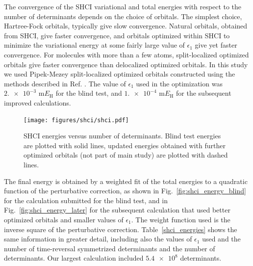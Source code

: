 \documentclass[journal=jcp,manuscript=suppinfo]{achemso}
\begin{document}
The convergence of the SHCI variational and total energies with respect to the number of determinants depends on the choice of orbitals. The simplest choice, Hartree-Fock orbitals, typically give slow convergence. Natural orbitals, obtained from SHCI, give faster convergence, and orbitals optimized within SHCI to minimize the variational energy at some fairly large value of $\epsilon_1$ give yet faster convergence. For molecules with more than a few atoms, split-localized optimized orbitals give faster convergence than delocalized optimized orbitals. In this study we used Pipek-Mezey split-localized optimized orbitals constructed using the methods described in Ref. . The value of $\epsilon_1$ used in the optimization was $\num{2.e-3}$ m$E_{\text{H}}$ for the blind test, and $\num{1.e-4}$ m$E_{\text{H}}$ for the subsequent improved calculations.\\

%
\begin{figure}[ht!]
\begin{center}
\texttt{[image: figures/shci/shci.pdf]}
\caption{SHCI energies versus number of determinants.  Blind test energies are plotted with solid lines, updated energies obtained with further optimized orbitals (not part of main study) are plotted with dashed lines.}
\label{shci_SI_fig}
\end{center}
\vspace{-0.6cm}
\end{figure}
%
The final energy is obtained by a weighted fit of the total energies to a quadratic function of the perturbative correction, as shown in Fig.~\ref{fig:shci_energy_blind} for the calculation submitted for the blind test, and in Fig.~\ref{fig:shci_energy_later} for the subsequent calculation that used better optimized orbitals and smaller values of $\epsilon_1$. The weight function used is the inverse square of the perturbative correction. Table~\ref{shci_energies} shows the same information in greater detail, including also the values of $\epsilon_1$ used
and the number of time-reversal symmetrized determinants and the number of determinants. Our largest calculation included $\num{5.4e8}$ determinants.\\
\end{document}
